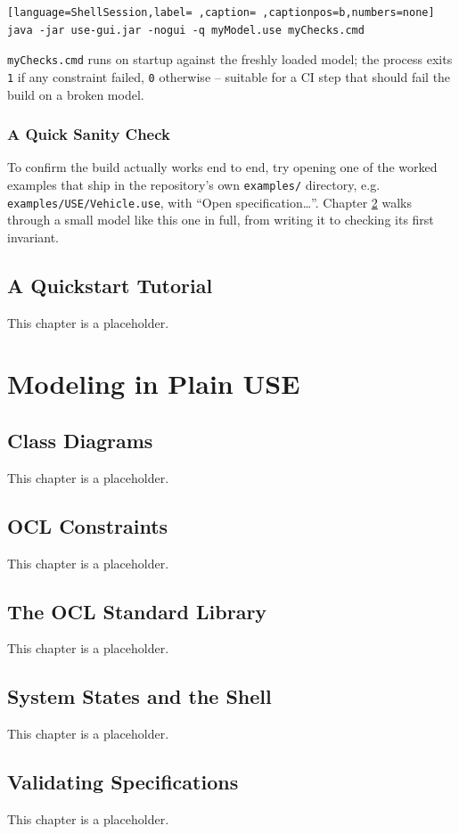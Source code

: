 \documentclass[11pt,twoside,a4paper]{book}
\begin{document}
\begin{lstlisting}[language=ShellSession,label= ,caption= ,captionpos=b,numbers=none]
java -jar use-gui.jar -nogui -q myModel.use myChecks.cmd
\end{lstlisting}

\texttt{myChecks.cmd} runs on startup against the freshly loaded model; the
process exits \texttt{1} if any constraint failed, \texttt{0} otherwise -- suitable
for a CI step that should fail the build on a broken model.

\section{A Quick Sanity Check}
\label{sec:org4b27450}
To confirm the build actually works end to end, try opening one of the
worked examples that ship in the repository's own \texttt{examples/}
directory, e.g. \texttt{examples/USE/Vehicle.use}, with ``Open
specification\ldots{}''. Chapter \ref{sec:orgd9cc398} walks through
a small model like this one in full, from writing it to checking its
first invariant.
\chapter{A Quickstart Tutorial}
\label{sec:orgd9cc398}
This chapter is a placeholder.
\part{Modeling in Plain USE}
\label{sec:org2c3ff8a}
\chapter{Class Diagrams}
\label{sec:org145cbce}
This chapter is a placeholder.
\chapter{OCL Constraints}
\label{sec:org68ceb0a}
This chapter is a placeholder.
\chapter{The OCL Standard Library}
\label{sec:org2d77302}
This chapter is a placeholder.
\chapter{System States and the Shell}
\label{sec:org66d4965}
This chapter is a placeholder.
\chapter{Validating Specifications}
\label{sec:orgf947642}
This chapter is a placeholder.
\end{document}

